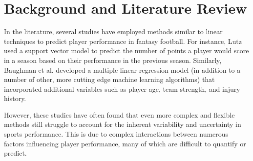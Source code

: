 \chapter{Background and Literature Review}
\label{ch:background}
\glsresetall

In the literature, several studies have employed methods similar to linear techniques to predict player performance in fantasy football. For instance, 
Lutz \cite{lutz2015}
used a support vector model to predict the number of points a player would score in a season based on their performance in the previous season. Similarly, 
Baughman et al.  \cite{baughman2021}
developed a multiple linear regression model (in addition to a number of other, more cutting edge machine learning algorithms) that incorporated additional variables such as player age, team strength, and injury history.

However, these studies have often found that even more complex and flexible methods still struggle to account for the inherent variability and uncertainty in sports performance. This is due to complex interactions between numerous factors influencing player performance, many of which are difficult to quantify or predict.



